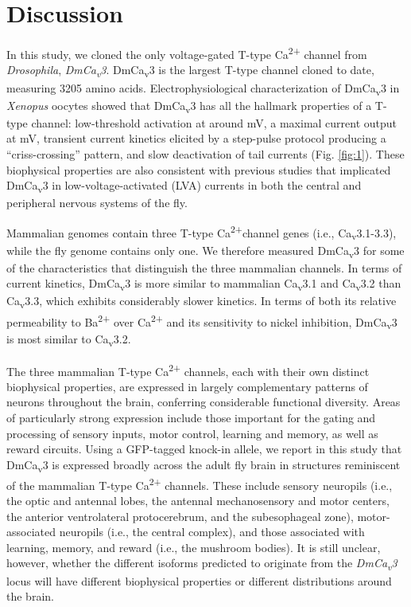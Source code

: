 \section*{Discussion}

In this study, we cloned the only voltage-gated T-type Ca\textsuperscript{2+} channel from \emph{Drosophila}, \emph{DmCa\textsubscript{v}3}.
DmCa\textsubscript{v}3 is the largest T-type channel cloned to date, measuring 3205 amino acids\cite{senatore:2010aa}.
Electrophysiological characterization of DmCa\textsubscript{v}3 in \emph{Xenopus} oocytes showed that DmCa\textsubscript{v}3 has all the hallmark properties of a T-type channel: low-threshold activation at around  mV, a maximal current output at  mV, transient current kinetics elicited by a step-pulse protocol producing a ``criss-crossing'' pattern, and slow deactivation of tail currents (Fig. \ref{fig:1}).
These biophysical properties are also consistent with previous studies that implicated DmCa\textsubscript{v}3 in low-voltage-activated (LVA) currents in both the central and peripheral nervous systems of the fly\cite{Ryglewski:2012jk, Iniguez:2013ib}.

Mammalian genomes contain three T-type Ca\textsuperscript{2+}channel genes (i.e., Ca\textsubscript{v}3.1-3.3), while the fly genome contains only one.
We therefore measured DmCa\textsubscript{v}3 for some of the characteristics that distinguish the three mammalian channels.
In terms of current kinetics, DmCa\textsubscript{v}3 is more similar to mammalian Ca\textsubscript{v}3.1 and Ca\textsubscript{v}3.2 than Ca\textsubscript{v}3.3, which exhibits considerably  slower kinetics.
In terms of both its relative permeability to Ba\textsuperscript{2+} over Ca\textsuperscript{2+} and its sensitivity to nickel inhibition, DmCa\textsubscript{v}3 is most similar to Ca\textsubscript{v}3.2\cite{kang:2006aa, park:2013aa}.

The three mammalian T-type Ca\textsuperscript{2+} channels,  each with their own distinct biophysical properties, are expressed in largely complementary patterns of neurons throughout the brain, conferring considerable functional diversity. Areas of particularly strong expression include those important for the gating and processing of sensory inputs, motor control, learning and memory, as well as reward circuits\cite{talley:1999aa}. 
Using a GFP-tagged knock-in allele, we report in this study that DmCa\textsubscript{v}3 is expressed broadly across the adult fly brain in structures reminiscent of the mammalian T-type Ca\textsuperscript{2+} channels.
These include sensory neuropils (i.e., the optic and antennal lobes, the antennal mechanosensory and motor centers, the anterior ventrolateral protocerebrum, and the subesophageal zone), motor-associated neuropils (i.e., the central complex), and those associated with learning, memory, and reward (i.e., the mushroom bodies).
It is still unclear, however, whether the different isoforms predicted to originate from the \emph{DmCa\textsubscript{v}3} locus will have different biophysical properties or different distributions around the brain. 

